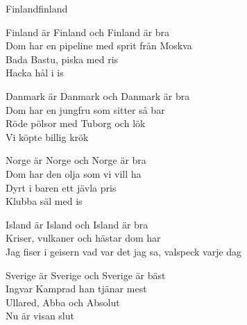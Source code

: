 \begin{song}{Finland}{finland}
\begin{vers}
Finland är Finland och Finland är bra\\
Dom har en pipeline med sprit från Moskva\\
Bada Bastu, piska med ris\\
Hacka hål i is\\
\end{vers}
\begin{vers}
Danmark är Danmark och Danmark är bra\\
Dom har en jungfru som sitter så bar\\
Röde pölsor med Tuborg och lök\\
Vi köpte billig krök\\
\end{vers}
\begin{vers}
Norge är Norge och Norge är bra\\
Dom har den olja som vi vill ha\\
Dyrt i baren ett jävla pris\\
Klubba säl med is\\
\end{vers}
\begin{vers}
Island är Island och Island är bra\\
Kriser, vulkaner och hästar dom har\\
Jag fiser i geisern vad var det jag sa, valspeck varje dag\\
\end{vers}
\begin{vers}
Sverige är Sverige och Sverige är bäst\\
Ingvar Kamprad han tjänar mest\\
Ullared, Abba och Absolut\\
Nu är visan slut\\
\end{vers}
\end{song}
